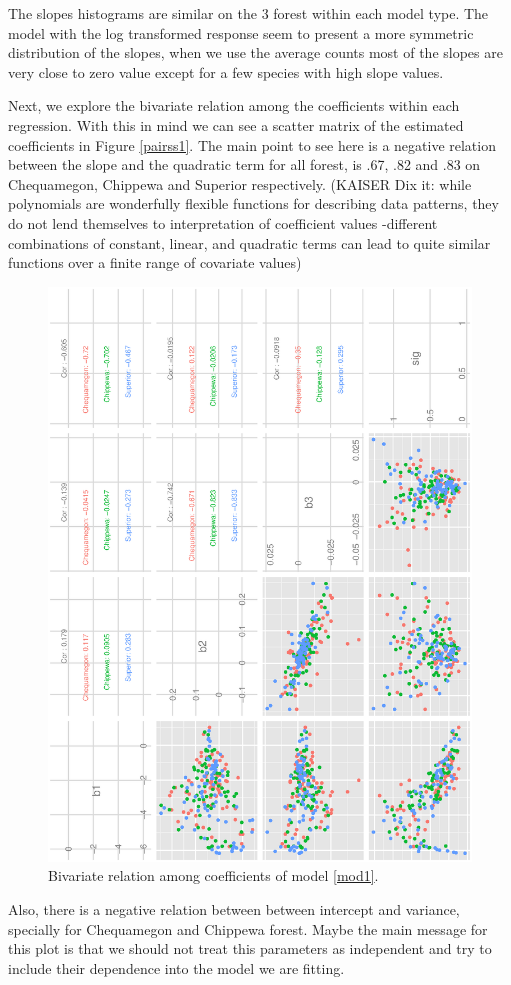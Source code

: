 \documentclass{article}
\begin{document}
The slopes histograms are similar on the 3 forest within each model type. The model with the log transformed response seem to present a more symmetric distribution of the slopes, when we use the average counts most of the slopes are very close to zero value except for a few species with high slope values. 

Next, we explore the bivariate relation among the coefficients within each regression. With this in mind we can see a scatter matrix of the estimated coefficients in Figure \ref{pairss1}. The main point to see here is a negative relation between the slope and the quadratic term for all forest, is .67, .82 and .83 on Chequamegon, Chippewa and Superior respectively. (KAISER Dix it: while polynomials are wonderfully flexible functions for describing data patterns, they do not lend themselves to interpretation of coefficient values -different combinations of constant, linear, and quadratic terms can lead to quite similar functions over a finite range of covariate values) 

\begin{figure}[h!]
\centering
\includegraphics[scale=.6, angle=-90]{scat_m1.ps}
\caption{Bivariate relation among coefficients of model \ref{mod1}. \label{pairs1}}
\end{figure}
Also, there is a negative relation between between intercept and variance, specially for Chequamegon and Chippewa forest. Maybe the main message for this plot is that we should not treat this parameters as independent and try to include their dependence into the model we are fitting. 
\end{document}
